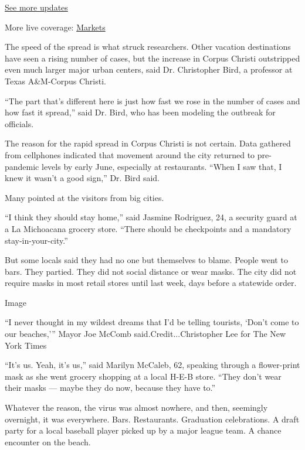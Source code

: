 \href{https://www.nytimes.com/2020/08/04/world/coronavirus-covid-19.html?action=click\&pgtype=Article\&state=default\&region=MAIN_CONTENT_1\&context=storylines_live_updates}{See
more updates}

More live coverage:
\href{https://www.nytimes.com/live/2020/08/03/business/stock-market-today-coronavirus?action=click\&pgtype=Article\&state=default\&region=MAIN_CONTENT_1\&context=storylines_live_updates}{Markets}

The speed of the spread is what struck researchers. Other vacation
destinations have seen a rising number of cases, but the increase in
Corpus Christi outstripped even much larger major urban centers, said
Dr. Christopher Bird, a professor at Texas A\&M-Corpus Christi.

``The part that's different here is just how fast we rose in the number
of cases and how fast it spread,'' said Dr. Bird, who has been modeling
the outbreak for officials.

The reason for the rapid spread in Corpus Christi is not certain. Data
gathered from cellphones indicated that movement around the city
returned to pre-pandemic levels by early June, especially at
restaurants. ``When I saw that, I knew it wasn't a good sign,'' Dr. Bird
said.

Many pointed at the visitors from big cities.

``I think they should stay home,'' said Jasmine Rodriguez, 24, a
security guard at a La Michoacana grocery store. ``There should be
checkpoints and a mandatory stay-in-your-city.''

But some locals said they had no one but themselves to blame. People
went to bars. They partied. They did not social distance or wear masks.
The city did not require masks in most retail stores until last week,
days before a statewide order.

Image

``I never thought in my wildest dreams that I'd be telling tourists,
`Don't come to our beaches,''' Mayor Joe McComb
said.Credit...Christopher Lee for The New York Times

``It's us. Yeah, it's us,'' said Marilyn McCaleb, 62, speaking through a
flower-print mask as she went grocery shopping at a local H-E-B store.
``They don't wear their masks --- maybe they do now, because they have
to.''

Whatever the reason, the virus was almost nowhere, and then, seemingly
overnight, it was everywhere. Bars. Restaurants. Graduation
celebrations. A draft party for a local baseball player picked up by a
major league team. A chance encounter on the beach.

